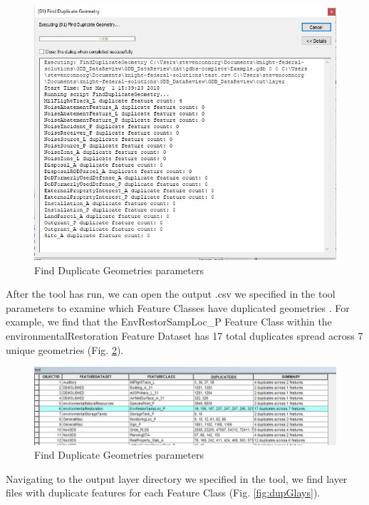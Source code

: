 \documentclass[openany]{book}
\theoremstyle{definition}
\theoremstyle{definition}
\theoremstyle{definition}
\theoremstyle{remark}
\begin{document}
\begin{figure}[H]

{\centering \includegraphics{figures/dupG-messages} 

}

\caption{Find Duplicate Geometries parameters}\label{fig:dupGmessages}
\end{figure}

After the tool has run, we can open the output .csv we specified in the
tool parameters to examine which Feature Classes have duplicated
geometries . For example, we find that the EnvRestorSampLoc\_P Feature
Class within the environmentalRestoration Feature Dataset has 17 total
duplicates spread across 7 unique geometries (Fig. \ref{fig:dupGcsv}).

\begin{figure}[H]

{\centering \includegraphics{figures/dupG-csv} 

}

\caption{Find Duplicate Geometries parameters}\label{fig:dupGcsv}
\end{figure}

Navigating to the output layer directory we specified in the tool, we
find layer files with duplicate features for each Feature Class (Fig.
\ref{fig:dupGlays}).
\end{document}

